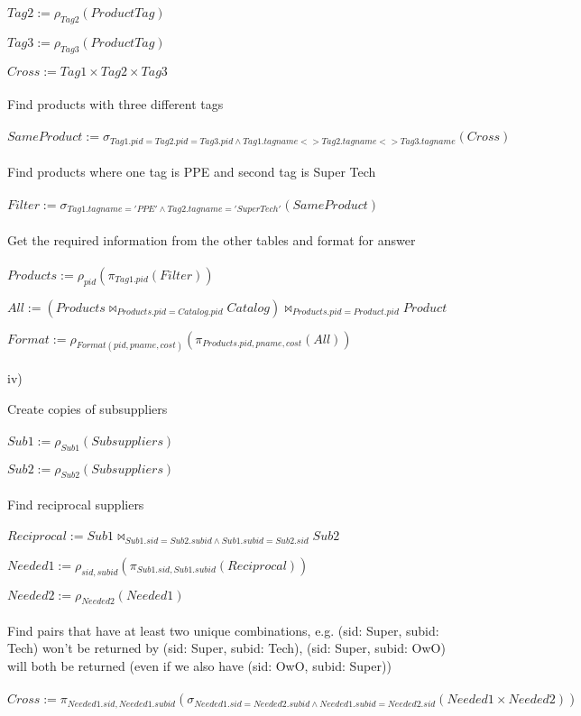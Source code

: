 \documentclass[11pt]{article}
\begin{document}
$Tag2 := \rho_{Tag2}(ProductTag)$

$Tag3 := \rho_{Tag3}(ProductTag)$

$Cross := Tag1 \times Tag2 \times Tag3$
\\~\\
Find products with three different tags
\\~\\
$SameProduct := \sigma_{Tag1.pid = Tag2.pid = Tag3.pid \wedge Tag1.tagname <> Tag2.tagname <> Tag3.tagname}(Cross)$
\\~\\
Find products where one tag is PPE and second tag is Super Tech
\\~\\
$Filter := \sigma_{Tag1.tagname = 'PPE' \wedge Tag2.tagname ='Super Tech'}(SameProduct)$
\\~\\
Get the required information from the other tables and format for answer
\\~\\
$Products := \rho_{pid}(\pi_{Tag1.pid}(Filter))$

$All := (Products \bowtie_{Products.pid = Catalog.pid} Catalog) \bowtie_{Products.pid = Product.pid} Product$

$Format := \rho_{Format(pid, pname, cost)}(\pi_{Products.pid, pname, cost}(All))$
\\~\\
iv)

Create copies of subsuppliers
\\~\\
$Sub1 := \rho_{Sub1}(Subsuppliers)$

$Sub2 := \rho_{Sub2}(Subsuppliers)$
\\~\\
Find reciprocal suppliers
\\~\\
$Reciprocal := Sub1 \bowtie_{Sub1.sid = Sub2.subid \wedge Sub1.subid = Sub2.sid} Sub2$

$Needed1 := \rho_{sid, subid}(\pi_{Sub1.sid, Sub1.subid}(Reciprocal))$

$Needed2 := \rho_{Needed2}(Needed1)$
\\~\\
Find pairs that have at least two unique combinations, e.g. (sid: Super, subid: Tech) won't be returned by (sid: Super, subid: Tech), (sid: Super, subid: OwO) will both be returned (even if we also have (sid: OwO, subid: Super))
\\~\\
$Cross := \pi_{Needed1.sid, Needed1.subid}(\sigma_{Needed1.sid = Needed2.subid \wedge Needed1.subid = Needed2.sid}(Needed1 \times Needed2))$
\end{document}
